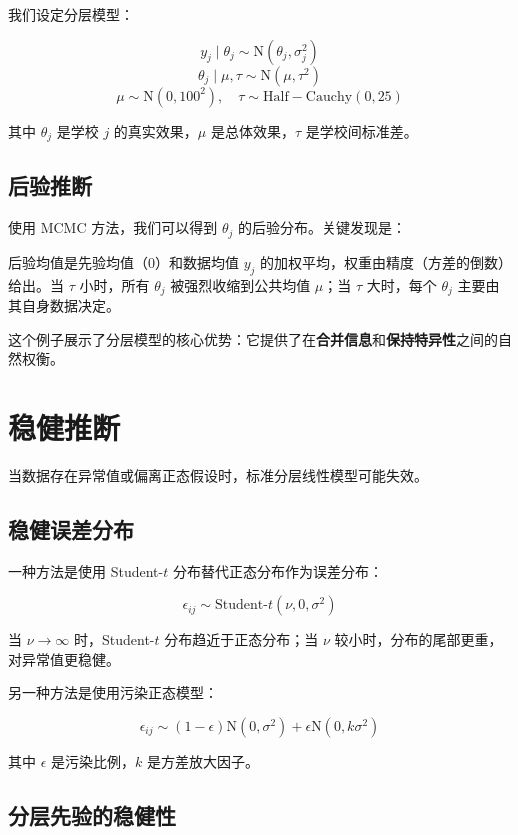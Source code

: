 我们设定分层模型：

\[
y_j \mid \theta_j \sim \mathrm{N}(\theta_j, \sigma_j^2)
\]
\[
\theta_j \mid \mu, \tau \sim \mathrm{N}(\mu, \tau^2)
\]
\[
\mu \sim \mathrm{N}(0, 100^2), \quad \tau \sim \mathrm{Half-Cauchy}(0, 25)
\]

其中 $\theta_j$ 是学校 $j$ 的真实效果，$\mu$ 是总体效果，$\tau$ 是学校间标准差。

\subsection{后验推断}
\label{sec:coaching-posterior}

使用 MCMC 方法，我们可以得到 $\theta_j$ 的后验分布。关键发现是：

\begin{Remark}
后验均值是先验均值（0）和数据均值 $y_j$ 的加权平均，权重由精度（方差的倒数）给出。当 $\tau$ 小时，所有 $\theta_j$ 被强烈收缩到公共均值 $\mu$；当 $\tau$ 大时，每个 $\theta_j$ 主要由其自身数据决定。
\end{Remark}

这个例子展示了分层模型的核心优势：它提供了在\textbf{合并信息}和\textbf{保持特异性}之间的自然权衡。

\section{稳健推断}
\label{sec:robust-inference}

当数据存在异常值或偏离正态假设时，标准分层线性模型可能失效。

\subsection{稳健误差分布}
\label{sec:robust-error}

一种方法是使用 Student-$t$ 分布替代正态分布作为误差分布：

\[
\epsilon_{ij} \sim \text{Student-}t(\nu, 0, \sigma^2)
\]

当 $\nu \to \infty$ 时，Student-$t$ 分布趋近于正态分布；当 $\nu$ 较小时，分布的尾部更重，对异常值更稳健。

另一种方法是使用污染正态模型：

\[
\epsilon_{ij} \sim (1 - \epsilon) \mathrm{N}(0, \sigma^2) + \epsilon \mathrm{N}(0, k\sigma^2)
\]

其中 $\epsilon$ 是污染比例，$k$ 是方差放大因子。

\subsection{分层先验的稳健性}
\label{sec:robust-prior}

